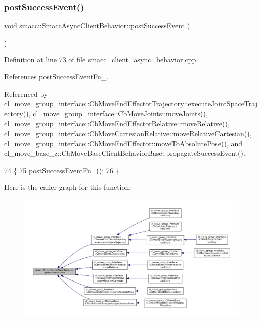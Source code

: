 \subsubsection{\texorpdfstring{post\+Success\+Event()}{postSuccessEvent()}}
{\footnotesize\ttfamily void smacc\+::\+Smacc\+Async\+Client\+Behavior\+::post\+Success\+Event (\begin{DoxyParamCaption}{ }\end{DoxyParamCaption})\hspace{0.3cm}{\ttfamily [protected]}}



Definition at line 73 of file smacc\+\_\+client\+\_\+async\+\_\+behavior.\+cpp.



References post\+Success\+Event\+Fn\+\_\+.



Referenced by cl\+\_\+move\+\_\+group\+\_\+interface\+::\+Cb\+Move\+End\+Effector\+Trajectory\+::execute\+Joint\+Space\+Trajectory(), cl\+\_\+move\+\_\+group\+\_\+interface\+::\+Cb\+Move\+Joints\+::move\+Joints(), cl\+\_\+move\+\_\+group\+\_\+interface\+::\+Cb\+Move\+End\+Effector\+Relative\+::move\+Relative(), cl\+\_\+move\+\_\+group\+\_\+interface\+::\+Cb\+Move\+Cartesian\+Relative\+::move\+Relative\+Cartesian(), cl\+\_\+move\+\_\+group\+\_\+interface\+::\+Cb\+Move\+End\+Effector\+::move\+To\+Absolute\+Pose(), and cl\+\_\+move\+\_\+base\+\_\+z\+::\+Cb\+Move\+Base\+Client\+Behavior\+Base\+::propagate\+Success\+Event().


\begin{DoxyCode}
74     \{
75         \hyperlink{classsmacc_1_1SmaccAsyncClientBehavior_a944ed10880796d53649bee39dc1299c0}{postSuccessEventFn\_}();
76     \}
\end{DoxyCode}
Here is the caller graph for this function\+:
\nopagebreak
\begin{figure}[H]
\begin{center}
\leavevmode
\includegraphics[width=350pt]{classsmacc_1_1SmaccAsyncClientBehavior_adf18efe1f0e4eacc1277b8865a8a94b1_icgraph}
\end{center}
\end{figure}



